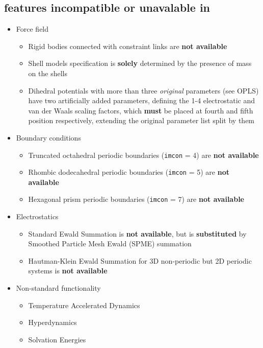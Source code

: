 \subsection{\C features incompatible or unavalable in \D{}}

\begin{itemize}
\item Force field
\begin{itemize}
\item Rigid bodies connected with constraint links are {\bf not available}
\item Shell models specification is {\bf solely} determined
by the presence of mass on the shells
\item Dihedral potentials with more than three {\em original}
parameters (see OPLS) have two artificially added parameters,
defining the 1-4 electrostatic and van der Waals scaling
factors, which {\bf must} be placed at fourth and fifth position
respectively, extending the original parameter list split by them
\end{itemize}
\item Boundary conditions
\begin{itemize}
\item Truncated octahedral periodic boundaries ({\tt imcon} = 4)
are {\bf not available}
\item Rhombic dodecahedral periodic boundaries ({\tt imcon} = 5)
are {\bf not available}
\item Hexagonal prism periodic boundaries ({\tt imcon} = 7)
are {\bf not available}
\end{itemize}
\item Electrostatics
\begin{itemize}
\item Standard Ewald Summation is {\bf not available}, but is
{\bf substituted} by Smoothed Particle Mesh Ewald (SPME) summation
\item Hautman-Klein Ewald Summation for 3D non-periodic
but 2D periodic systems is {\bf not available}
\end{itemize}
\item Non-standard functionality
\begin{itemize}
\item Temperature Accelerated Dynamics
\item Hyperdynamics
\item Solvation Energies
\end{itemize}
\end{itemize}

